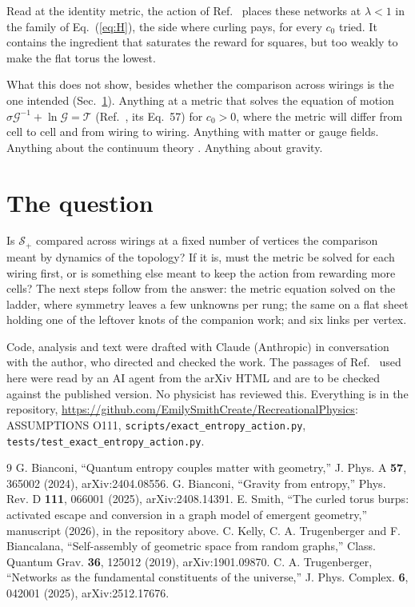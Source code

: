 \documentclass[pre,twocolumn,superscriptaddress,nofootinbib]{revtex4-2}
\begin{document}
Read at the identity metric, the action of Ref.~\cite{Bia24} places these networks at $\lambda<1$ in the family of
Eq.~(\ref{eq:H}), the side where curling pays, for every $c_0$ tried. It contains the ingredient that saturates the
reward for squares, but too weakly to make the flat torus the lowest.

What this does not show, besides whether the comparison across wirings is the one intended (Sec.~\ref{sec:question}).
Anything at a metric that solves the equation of motion
$\sigma\boldsymbol{\mathcal{G}}^{-1}+\ln\boldsymbol{\mathcal{G}}=\boldsymbol{\mathcal{T}}$ (Ref.~\cite{Bia24}, its
Eq.~57) for $c_0>0$, where the metric will differ from cell to cell and from wiring to wiring. Anything with matter
or gauge fields. Anything about the continuum theory \cite{Bia25}. Anything about gravity.

\section{The question}
\label{sec:question}

Is $\mathcal{S}_+$ compared across wirings at a fixed number of vertices the comparison meant by dynamics of the
topology? If it is, must the metric be solved for each wiring first, or is something else meant to keep the action
from rewarding more cells? The next steps follow from the answer: the metric equation solved on the ladder, where
symmetry leaves a few unknowns per rung; the same on a flat sheet holding one of the leftover knots of the companion
work; and six links per vertex.

\begin{acknowledgments}
Code, analysis and text were drafted with Claude (Anthropic) in conversation with the author, who directed and
checked the work. The passages of Ref.~\cite{Bia24} used here were read by an AI agent from the arXiv HTML and are to
be checked against the published version. No physicist has reviewed this. Everything is in the repository,
\url{https://github.com/EmilySmithCreate/RecreationalPhysics}: ASSUMPTIONS O111,
\texttt{scripts/exact\_entropy\_action.py}, \texttt{tests/test\_exact\_entropy\_action.py}.
\end{acknowledgments}

\begin{thebibliography}{9}
 G. Bianconi, ``Quantum entropy couples matter with geometry,'' J. Phys. A \textbf{57}, 365002 (2024),
arXiv:2404.08556.
 G. Bianconi, ``Gravity from entropy,'' Phys. Rev. D \textbf{111}, 066001 (2025), arXiv:2408.14391.
 E. Smith, ``The curled torus burps: activated escape and conversion in a graph model of emergent
geometry,'' manuscript (2026), in the repository above.
 C. Kelly, C. A. Trugenberger and F. Biancalana, ``Self-assembly of geometric space from random
graphs,'' Class. Quantum Grav. \textbf{36}, 125012 (2019), arXiv:1901.09870.
 C. A. Trugenberger, ``Networks as the fundamental constituents of the universe,'' J. Phys. Complex.
\textbf{6}, 042001 (2025), arXiv:2512.17676.
\end{thebibliography}
\end{document}
